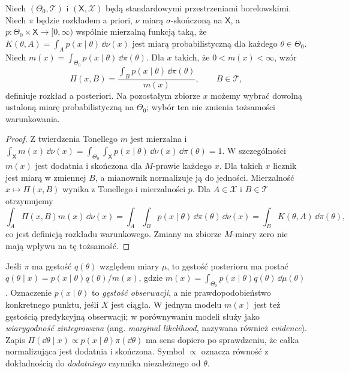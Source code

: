 \begin{twierdzenie}
\label{thm:bayes-dominated}
Niech $(\Theta_0,\mathcal T)$ i $(\mathsf X,\mathcal X)$ będą
standardowymi przestrzeniami borelowskimi. Niech $\pi$ będzie
rozkładem a priori, $\nu$ miarą $\sigma$-skończoną na $\mathsf X$,
a $p:\Theta_0\times\mathsf X\to[0,\infty)$ wspólnie mierzalną
funkcją taką, że
$K(\theta,A)=\int_A p(x\mid\theta)\,\dd\nu(x)$
jest miarą probabilistyczną dla każdego $\theta\in\Theta_0$.
Niech $m(x)=\int_{\Theta_0}p(x\mid\theta)\,\dd\pi(\theta)$.
Dla $x$ takich, że $0<m(x)<\infty$, wzór
\[
 \Pi(x,B)=\frac{\int_B p(x\mid\theta)\,\dd\pi(\theta)}{m(x)},
 \qquad B\in\mathcal T,
\]
definiuje rozkład a posteriori. Na pozostałym zbiorze $x$ możemy
wybrać dowolną ustaloną miarę probabilistyczną na $\Theta_0$;
wybór ten nie zmienia tożsamości warunkowania.
\end{twierdzenie}
\begin{proof}
Z twierdzenia Tonellego $m$ jest mierzalna i
$\int_{\mathsf X}m(x)\,\dd\nu(x)=
\int_{\Theta_0}\int_{\mathsf X}p(x\mid\theta)\,\dd\nu(x)\,\dd\pi(\theta)=1$.
W szczególności $m(x)$ jest dodatnia i skończona dla
$M$-prawie każdego $x$. Dla takich $x$ licznik jest miarą w
zmiennej $B$, a mianownik normalizuje ją do jedności.
Mierzalność $x\mapsto\Pi(x,B)$ wynika z Tonellego i mierzalności
$p$. Dla $A\in\mathcal X$ i $B\in\mathcal T$ otrzymujemy
\[
 \int_A\Pi(x,B)m(x)\,\dd\nu(x)
 =\int_A\int_B p(x\mid\theta)\,\dd\pi(\theta)\,\dd\nu(x)
 =\int_BK(\theta,A)\,\dd\pi(\theta),
\]
co jest definicją rozkładu warunkowego. Zmiany na zbiorze
$M$-miary zero nie mają wpływu na tę tożsamość.
\end{proof}

\begin{uwaga}
Jeśli $\pi$ ma gęstość $q(\theta)$ względem miary $\mu$,
to gęstość posterioru ma postać
$q(\theta\mid x)=p(x\mid\theta)q(\theta)/m(x)$,
gdzie $m(x)=\int_{\Theta_0}p(x\mid\theta)q(\theta)\,\dd\mu(\theta)$.
Oznaczenie $p(x\mid\theta)$ to \emph{gęstość obserwacji}, a nie
prawdopodobieństwo konkretnego punktu, jeśli $X$ jest ciągła.
W jednym modelu $m(x)$ jest też gęstością predykcyjną obserwacji;
w porównywaniu modeli służy jako \emph{wiarygodność zintegrowana}
(ang. \emph{marginal likelihood}, nazywana również \emph{evidence}).
Zapis $\Pi(\dd\theta\mid x)\propto p(x\mid\theta)\pi(\dd\theta)$
ma sens dopiero po sprawdzeniu, że całka normalizująca jest dodatnia
i skończona. Symbol $\propto$ oznacza równość z dokładnością do
\emph{dodatniego} czynnika niezależnego od $\theta$.
\end{uwaga}

